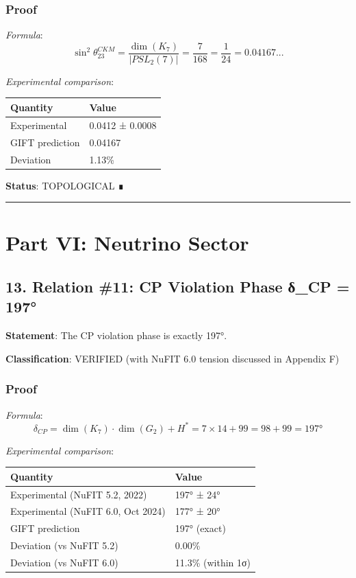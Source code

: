 \documentclass[11pt,a4paper]{article}
\begin{document}
\subsubsection{Proof}\label{proof-14}

\emph{Formula}:
\[\sin^2\theta_{23}^{CKM} = \frac{\dim(K_7)}{|PSL_2(7)|} = \frac{7}{168} = \frac{1}{24} = 0.04167...\]

\emph{Experimental comparison}:

{\def\LTcaptype{none} %
\begin{longtable}[]{@{}ll@{}}
\toprule\noalign{}
Quantity & Value \\
\midrule\noalign{}
\endhead
\bottomrule\noalign{}
\endlastfoot
Experimental & 0.0412 ± 0.0008 \\
GIFT prediction & 0.04167 \\
Deviation & 1.13\% \\
\end{longtable}
}

\textbf{Status}: TOPOLOGICAL ∎

\begin{center}\rule{0.5\linewidth}{0.5pt}\end{center}

\section{Part VI: Neutrino Sector}\label{part-vi-neutrino-sector}

\subsection{13. Relation \#11: CP Violation Phase δ\_CP = 197°}\label{relation-11-cp-violation-phase-ux3b4_cp-197}

\textbf{Statement}: The CP violation phase is exactly 197°.

\textbf{Classification}: VERIFIED (with NuFIT 6.0 tension discussed in Appendix F)

\subsubsection{Proof}\label{proof-15}

\emph{Formula}:
\[\delta_{CP} = \dim(K_7) \cdot \dim(G_2) + H^* = 7 \times 14 + 99 = 98 + 99 = 197°\]

\emph{Experimental comparison}:

{\def\LTcaptype{none} %
\begin{longtable}[]{@{}ll@{}}
\toprule\noalign{}
Quantity & Value \\
\midrule\noalign{}
\endhead
\bottomrule\noalign{}
\endlastfoot
Experimental (NuFIT 5.2, 2022) & 197° ± 24° \\
Experimental (NuFIT 6.0, Oct 2024) & 177° ± 20° \\
GIFT prediction & 197° (exact) \\
Deviation (vs NuFIT 5.2) & 0.00\% \\
Deviation (vs NuFIT 6.0) & 11.3\% (within 1σ) \\
\end{longtable}
}
\end{document}
